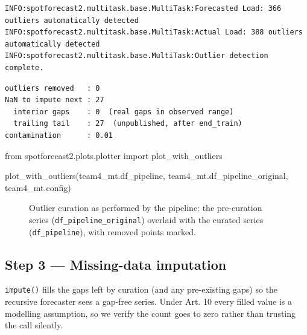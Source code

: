 \documentclass[
  english,
  letterpaper,
]{scrbook}
\newenvironment{Shaded}{\begin{snugshade}}{\end{snugshade}}
\newcommand{\ImportTok}[1]{\textcolor[rgb]{0.00,0.46,0.62}{#1}}
\newcommand{\NormalTok}[1]{\textcolor[rgb]{0.00,0.23,0.31}{#1}}
\begin{document}
\begin{verbatim}
INFO:spotforecast2.multitask.base.MultiTask:Forecasted Load: 366 outliers automatically detected
INFO:spotforecast2.multitask.base.MultiTask:Actual Load: 388 outliers automatically detected
INFO:spotforecast2.multitask.base.MultiTask:Outlier detection complete.
\end{verbatim}

\begin{verbatim}
outliers removed   : 0
NaN to impute next : 27
  interior gaps    : 0  (real gaps in observed range)
  trailing tail    : 27  (unpublished, after end_train)
contamination      : 0.01
\end{verbatim}

\begin{Shaded}
\begin{Highlighting}[]
\ImportTok{from}\NormalTok{ spotforecast2.plots.plotter }\ImportTok{import}\NormalTok{ plot\_with\_outliers}

\NormalTok{plot\_with\_outliers(team4\_mt.df\_pipeline, team4\_mt.df\_pipeline\_original, team4\_mt.config)}
\end{Highlighting}
\end{Shaded}

\begin{figure}


\caption{\label{fig-team4-outliers}Outlier curation as performed by the
pipeline: the pre-curation series (\texttt{df\_pipeline\_original})
overlaid with the curated series (\texttt{df\_pipeline}), with removed
points marked.}

\end{figure}%

\subsection{Step 3 --- Missing-data imputation}\label{sec-team4-impute}

\texttt{impute()} fills the gaps left by curation (and any pre-existing
gaps) so the recursive forecaster sees a gap-free series. Under Art. 10
every filled value is a modelling assumption, so we verify the count
goes to zero rather than trusting the call silently.
\end{document}
